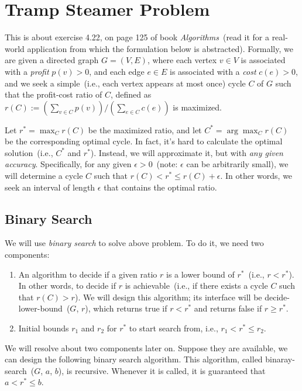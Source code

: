 \setcounter{definition}{0} \setcounter{property}{0} \setcounter{claim}{0} \setcounter{fact}{0} \setcounter{corollary}{0} \setcounter{figure}{0}
\section{Tramp Steamer Problem}

This is about exercise 4.22, on page 125 of book \emph{Algorithms}~(read it for a real-world application from which the formulation below is abstracted).
Formally, we are given a directed graph $G = (V, E)$,
where each vertex $v\in V$ is associated with a \emph{profit} $p(v) > 0$,
and each edge $e\in E$ is associated with a \emph{cost} $c(e) > 0$,
and we seek a simple~(i.e., each vertex appears at most once) cycle $C$ of $G$
such that the profit-cost ratio of $C$, defined as $r(C) := (\sum_{v\in C} p(v)) / (\sum_{e\in C} c(e))$
is maximized.

Let $r^* = \max_{C} r(C)$ be the maximized ratio, 
and let $C^* = \arg\max_{C} r(C)$ be the corresponding optimal cycle.
In fact, it's hard to calculate the optimal solution~(i.e., $C^*$ and $r^*$).
Instead, we will approximate it, but with \emph{any given accuracy}.
Specifically, for any given $\epsilon > 0$~(note: $\epsilon$ can be arbitrarily small),
we will determine a cycle $C$ such that $r(C) < r^* \le r(C) + \epsilon$.
In other words, we seek an interval of length $\epsilon$ that contains the optimal ratio.

\subsection*{Binary Search}

We will use \emph{binary search} to solve above problem. To do it, we need two components:
\vspace*{-\topsep}
\begin{enumerate}
\item An algorithm to decide if a given ratio $r$ is a lower bound of $r^*$~(i.e., $r < r^*$). 
In other words, to decide if $r$ is achievable~(i.e., if there exists a cycle $C$ such that $r(C) > r$).
We will design this algorithm; its interface will be decide-lower-bound~($G$, $r$), which
returns true if $r < r^*$ and returns false if $r \ge r^*$.
\item Initial bounds $r_1$ and $r_2$ for $r^*$ to start search from, i.e., $r_1 < r^* \le r_2$.
\end{enumerate}

We will resolve about two components later on. Suppose they are available, we can design the following binary
search algorithm. This algorithm, called binaray-search~($G$, $a$, $b$), is recursive.
Whenever it is called, it is guaranteed that $a < r^* \le b$.

